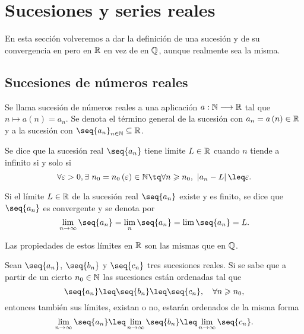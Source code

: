 \chapter{Sucesiones y series reales}
En esta sección volveremos a dar la definición de una sucesión y de su convergencia en pero en $\mathbb{R}$ en vez de en $\mathbb{Q}$, aunque realmente sea la misma.

\section{Sucesiones de números reales}
\begin{defi}[Sucesión]
    Se llama sucesión de números reales a una aplicación $a : \mathbb{N}\longrightarrow\mathbb{R}$ tal que
    $n\longmapsto a\left( n \right) = a_n$. Se denota el término general de la sucesión con $a_n = a\left( n \right) \in\mathbb{R}$ y a la sucesión con $\seq{a_n}_{n\in\N}\subseteq\R$.
\end{defi}

\begin{defi}
    Se dice que la sucesión real $\seq{a_n}$ tiene límite $L\in\mathbb{R}$ cuando $n$ tiende a infinito si y solo si
    \begin{equation}
        \forall\epsilon > 0, \exists\ n_0 = n_0\left( \epsilon \right) \in\N\tq \forall n \geq n_0,\ \abs{a_n - L} \leq \epsilon.
    \end{equation}
\end{defi}

\begin{defi}
    Si el límite $L\in\mathbb{R}$ de la sucesión real $\seq{a_n}$ existe y es finito, se dice que $\seq{a_n}$ es convergente y se denota por
    \begin{equation}
        \lim_{n\to\infty}\seq{a_n} = \lim_{n}\seq{a_n} = \lim \seq{a_n} = L.
    \end{equation}
\end{defi}

\begin{note}
    Las propiedades de estos límites en $\mathbb{R}$ son las mismas que en $\mathbb{Q}$.
\end{note}

\begin{theorem}
    Sean $\seq{a_n}$, $\seq{b_n}$ y $\seq{c_n}$ tres sucesiones reales. Si se sabe que a partir de un cierto $n_0\in\mathbb{N}$ las sucesiones están ordenadas tal que
    \begin{equation}
        \seq{a_n}\leq \seq{b_n}\leq \seq{c_n},\quad \forall n \geq n_0,
    \end{equation}
    entonces también sus límites, existan o no, estarán ordenados de la misma forma
    \begin{equation}
        \lim_{n\to\infty}\seq{a_n}\leq \lim_{n\to\infty} \seq{b_n} \leq \lim_{n\to\infty}\seq{c_n}.
    \end{equation}
\end{theorem}

